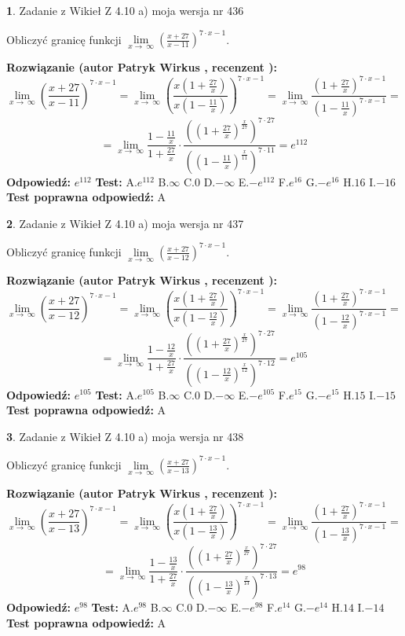 \documentclass[12pt, a4paper]{article}
\theoremstyle{definition} %
\newtheorem{zad}{}
\newcommand{\zadStart}[1]{\begin{zad}#1\newline}
\newcommand{\zadStop}{\end{zad}}
\newcommand{\rozwStart}[2]{\noindent \textbf{Rozwiązanie (autor #1 , recenzent #2): }\newline}
\newcommand{\rozwStop}{\newline}
\newcommand{\odpStart}{\noindent \textbf{Odpowiedź:}\newline}
\newcommand{\odpStop}{\newline}
\newcommand{\testStart}{\noindent \textbf{Test:}\newline}
\newcommand{\testStop}{\newline}
\newcommand{\kluczStart}{\noindent \textbf{Test poprawna odpowiedź:}\newline}
\newcommand{\kluczStop}{\newline}
\begin{document}
\zadStart{Zadanie z Wikieł Z 4.10 a) moja wersja nr 436}

Obliczyć granicę funkcji  $\lim\limits_{x\to\ \infty}(\frac{x+27}{x-11})^{7\cdot x-1}$.
\zadStop
\rozwStart{Patryk Wirkus}{}
$$\lim\limits_{x\to\ \infty}(\frac{x+27}{x-11})^{7\cdot x-1} = \lim\limits_{x\to\ \infty}(\frac{x(1+\frac{27}{x})}{x(1-\frac{11}{x})})^{7\cdot x-1}=\lim\limits_{x\to\ \infty}\frac{(1+\frac{27}{x})^{7\cdot x-1}}{(1-\frac{11}{x})^{7\cdot x-1}}=$$
$$=\lim\limits_{x\to\ \infty}\frac{1-\frac{11}{x}}{1+\frac{27}{x}}\cdot\frac{((1+\frac{27}{x})^{\frac{x}{27}})^{7\cdot27}}{((1-\frac{11}{x})^{\frac{x}{11}})^{7\cdot11}}=e^{112}$$
\rozwStop
\odpStart
$e^{112}$
\odpStop
\testStart
A.$e^{112}$ B.$\infty$ C.$0$ D.$-\infty$ E.$-e^{112}$
F.$e^{16}$ G.$-e^{16}$
H.$16$
I.$-16$
\testStop
\kluczStart
A
\kluczStop



\zadStart{Zadanie z Wikieł Z 4.10 a) moja wersja nr 437}

Obliczyć granicę funkcji  $\lim\limits_{x\to\ \infty}(\frac{x+27}{x-12})^{7\cdot x-1}$.
\zadStop
\rozwStart{Patryk Wirkus}{}
$$\lim\limits_{x\to\ \infty}(\frac{x+27}{x-12})^{7\cdot x-1} = \lim\limits_{x\to\ \infty}(\frac{x(1+\frac{27}{x})}{x(1-\frac{12}{x})})^{7\cdot x-1}=\lim\limits_{x\to\ \infty}\frac{(1+\frac{27}{x})^{7\cdot x-1}}{(1-\frac{12}{x})^{7\cdot x-1}}=$$
$$=\lim\limits_{x\to\ \infty}\frac{1-\frac{12}{x}}{1+\frac{27}{x}}\cdot\frac{((1+\frac{27}{x})^{\frac{x}{27}})^{7\cdot27}}{((1-\frac{12}{x})^{\frac{x}{12}})^{7\cdot12}}=e^{105}$$
\rozwStop
\odpStart
$e^{105}$
\odpStop
\testStart
A.$e^{105}$ B.$\infty$ C.$0$ D.$-\infty$ E.$-e^{105}$
F.$e^{15}$ G.$-e^{15}$
H.$15$
I.$-15$
\testStop
\kluczStart
A
\kluczStop



\zadStart{Zadanie z Wikieł Z 4.10 a) moja wersja nr 438}

Obliczyć granicę funkcji  $\lim\limits_{x\to\ \infty}(\frac{x+27}{x-13})^{7\cdot x-1}$.
\zadStop
\rozwStart{Patryk Wirkus}{}
$$\lim\limits_{x\to\ \infty}(\frac{x+27}{x-13})^{7\cdot x-1} = \lim\limits_{x\to\ \infty}(\frac{x(1+\frac{27}{x})}{x(1-\frac{13}{x})})^{7\cdot x-1}=\lim\limits_{x\to\ \infty}\frac{(1+\frac{27}{x})^{7\cdot x-1}}{(1-\frac{13}{x})^{7\cdot x-1}}=$$
$$=\lim\limits_{x\to\ \infty}\frac{1-\frac{13}{x}}{1+\frac{27}{x}}\cdot\frac{((1+\frac{27}{x})^{\frac{x}{27}})^{7\cdot27}}{((1-\frac{13}{x})^{\frac{x}{13}})^{7\cdot13}}=e^{98}$$
\rozwStop
\odpStart
$e^{98}$
\odpStop
\testStart
A.$e^{98}$ B.$\infty$ C.$0$ D.$-\infty$ E.$-e^{98}$
F.$e^{14}$ G.$-e^{14}$
H.$14$
I.$-14$
\testStop
\kluczStart
A
\kluczStop
\end{document}
